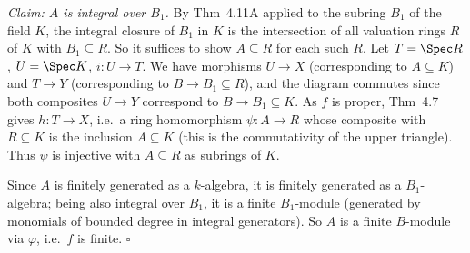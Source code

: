 \documentclass[11pt]{article}
\begin{document}
\emph{Claim: $A$ is integral over $B_1$.} By Thm~4.11A applied to the subring $B_1$ of the field $K$, the integral closure of $B_1$ in $K$ is the intersection of all valuation rings $R$ of $K$ with $B_1\subseteq R$. So it suffices to show $A\subseteq R$ for each such $R$. Let $T=\Spec R$, $U=\Spec K$, $i:U\to T$. We have morphisms $U\to X$ (corresponding to $A\subseteq K$) and $T\to Y$ (corresponding to $B\to B_1\subseteq R$), and the diagram commutes since both composites $U\to Y$ correspond to $B\to B_1\subseteq K$. As $f$ is proper, Thm~4.7 gives $h:T\to X$, i.e.\ a ring homomorphism $\psi:A\to R$ whose composite with $R\subseteq K$ is the inclusion $A\subseteq K$ (this is the commutativity of the upper triangle). Thus $\psi$ is injective with $A\subseteq R$ as subrings of $K$.

Since $A$ is finitely generated as a $k$-algebra, it is finitely generated as a $B_1$-algebra; being also integral over $B_1$, it is a finite $B_1$-module (generated by monomials of bounded degree in integral generators). So $A$ is a finite $B$-module via $\varphi$, i.e.\ $f$ is finite. \hfill$\square$
\end{document}
